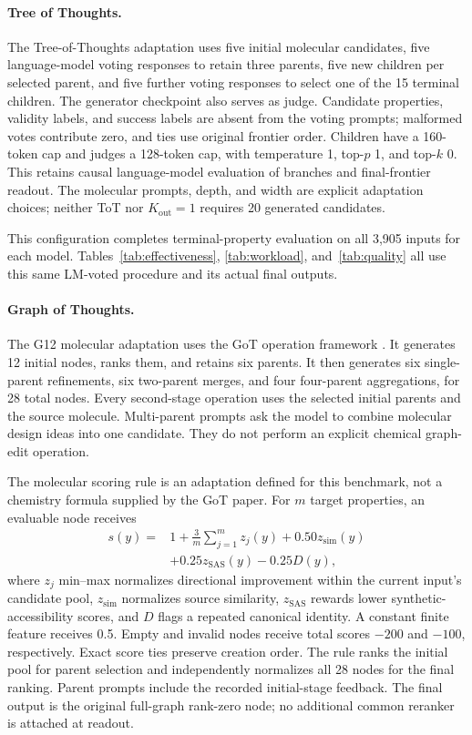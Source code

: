 \paragraph{Tree of Thoughts.}
\label{app:tot-scope}
The Tree-of-Thoughts adaptation \citep{tot2023} uses five initial molecular candidates, five language-model voting responses to retain three parents, five new children per selected parent, and five further voting responses to select one of the 15 terminal children. The generator checkpoint also serves as judge. Candidate properties, validity labels, and success labels are absent from the voting prompts; malformed votes contribute zero, and ties use original frontier order. Children have a 160-token cap and judges a 128-token cap, with temperature 1, top-$p$ 1, and top-$k$ 0. This retains causal language-model evaluation of branches and final-frontier readout. The molecular prompts, depth, and width are explicit adaptation choices; neither ToT nor $K_{\mathrm{out}}=1$ requires 20 generated candidates.

This configuration completes terminal-property evaluation on all 3,905 inputs for each model. Tables~\ref{tab:effectiveness}, \ref{tab:workload}, and~\ref{tab:quality} all use this same LM-voted procedure and its actual final outputs.

\paragraph{Graph of Thoughts.}
The G12 molecular adaptation uses the GoT operation framework \citep{got2024}. It generates 12 initial nodes, ranks them, and retains six parents. It then generates six single-parent refinements, six two-parent merges, and four four-parent aggregations, for 28 total nodes. Every second-stage operation uses the selected initial parents and the source molecule. Multi-parent prompts ask the model to combine molecular design ideas into one candidate. They do not perform an explicit chemical graph-edit operation.

The molecular scoring rule is an adaptation defined for this benchmark, not a chemistry formula supplied by the GoT paper. For $m$ target properties, an evaluable node receives
\begin{align}
 s(y)={}&1+\frac{3}{m}\sum_{j=1}^{m}z_j(y)
       +0.50z_{\mathrm{sim}}(y)\nonumber\\
       &+0.25z_{\mathrm{SAS}}(y)-0.25D(y),
\end{align}
where $z_j$ min--max normalizes directional improvement within the current input's candidate pool, $z_{\mathrm{sim}}$ normalizes source similarity, $z_{\mathrm{SAS}}$ rewards lower synthetic-accessibility scores, and $D$ flags a repeated canonical identity. A constant finite feature receives 0.5. Empty and invalid nodes receive total scores $-200$ and $-100$, respectively. Exact score ties preserve creation order. The rule ranks the initial pool for parent selection and independently normalizes all 28 nodes for the final ranking. Parent prompts include the recorded initial-stage feedback. The final output is the original full-graph rank-zero node; no additional common reranker is attached at readout.

